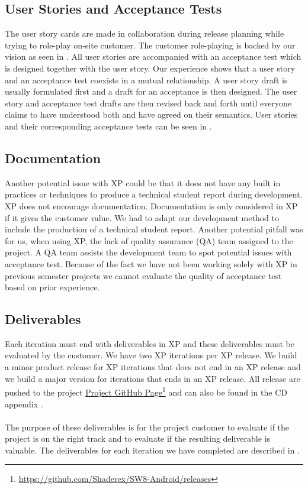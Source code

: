 \subsection{User Stories and Acceptance Tests}
The user story cards are made in collaboration during release planning while trying to role-play on-site customer. The customer role-playing is backed by our vision as seen in . All user stories are accompanied with an acceptance test which is designed together with the user story. Our experience shows that a user story and an acceptance test coexists in a mutual relationship. A user story draft is usually formulated first and a draft for an acceptance is then designed. The user story and acceptance test drafts are then revised back and forth until everyone claims to have understood both and have agreed on their semantics. User stories and their corresponding acceptance tests can be seen in .


\subsection{Documentation}
Another potential issue with XP could be that it does not have any built in practices or techniques to produce a technical student report during development. XP does not encourage documentation. Documentation is only considered in XP if it gives the customer value. We had to 
adapt our development method to include the production of a technical student report. Another potential pitfall was for us, when using XP, the lack of quality assurance (QA) team assigned to the project. A QA team assists the development team to spot potential issues with acceptance test. Because of the fact we have not been working solely with XP in previous semester projects we cannot evaluate the quality of acceptance test based on prior experience.

\subsection{Deliverables}
Each iteration must end with deliverables in XP and these deliverables must be evaluated by the customer. We have two XP iterations per XP release. We build a minor product release for XP iterations that does not end in an XP release and we build a major version for iterations that ends in an XP release. All release are pushed to the project \href{https://github.com/Shaderex/SW8-Android/releases}{Project GitHub Page}\footnote{\url{https://github.com/Shaderex/SW8-Android/releases}} and can also be found in the CD appendix . 
\\\\
The purpose of these deliverables is for the project customer to evaluate if the project is on the right track and to evaluate if the resulting deliverable is valuable. The deliverables for each iteration we have completed are described in . 

